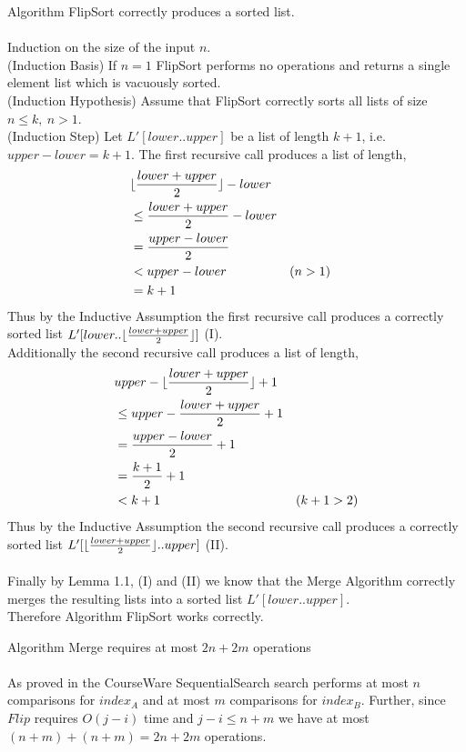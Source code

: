\documentclass[12pt]{article}
\newenvironment{lemma}[2][Lemma]{\begin{trivlist}
\item[\hskip \labelsep {\bfseries #1}\hskip \labelsep {\bfseries #2.}]}{\end{trivlist}}
\newenvironment{question}[2][Question]{\begin{trivlist}
\item[\hskip \labelsep {\bfseries #1}\hskip \labelsep {\bfseries #2.}]}{\end{trivlist}}
\DeclarePairedDelimiter{\floor}{\lfloor}{\rfloor}
\begin{document}
\begin{question}{1 (a)}
  \begin{lemma}{1.2} Algorithm FlipSort correctly produces a sorted list.
    \leavevmode \\ \\
    Induction on the size of the input $n$.\\
    (Induction Basis) If $n=1$ FlipSort performs no operations and returns a
    single element list which is vacuously sorted.\\
    (Induction Hypothesis) Assume that FlipSort correctly sorts all lists of size $n \leq k,\ n > 1$. \\
    (Induction Step) Let $L'[lower..upper]$ be a list of length $k + 1$, i.e.
    $upper - lower = k + 1$.  The first recursive call produces a list of length,
    \begin{align*}
       & \floor{\frac{lower + upper}{2}} - lower &\\
       & \leq \frac{lower + upper}{2} - lower & \\
       & = \frac{upper-lower}{2} & \\
       & < upper - lower & (n > 1) & \\
       & = k + 1 & 
    \end{align*}
    Thus by the Inductive Assumption the first recursive call produces a correctly
    sorted list $L'[lower..\floor{\frac{lower + upper}{2}}]$ (I).\\
    Additionally the second recursive call produces a list of length,
    \begin{align*}
      & upper  - \floor{\frac{lower + upper}{2}} + 1 & \\
      & \leq upper - \frac{lower + upper}{2} + 1 & \\
      & = \frac{upper - lower}{2} + 1 &\\
      & = \frac{k + 1}{2} + 1 &\\
      & < k + 1 & (k + 1 > 2)
    \end{align*}
    Thus by the Inductive Assumption the second recursive call produces a correctly
    sorted list $L'[\floor{\frac{lower + upper}{2}}..upper]$ (II). \\ \\
    Finally by Lemma 1.1, (I) and (II) we know that the Merge Algorithm correctly
    merges the resulting lists into a sorted list $L'[lower..upper]$.\\
    Therefore Algorithm FlipSort works correctly.
  \end{lemma}

  \begin{lemma}{1.3} Algorithm Merge requires at most $2n + 2m$ operations \\ \\
    As proved in the CourseWare SequentialSearch search performs at most $n$
    comparisons for $index_{A}$ and at most $m$ comparisons for $index_{B}$.
    Further, since $Flip$ requires $O(j - i)$ time and $j - i \leq n + m$ we
    have at most $(n + m) + (n + m) = 2n + 2m$ operations.
  \end{lemma}


\end{question}
\end{document}
